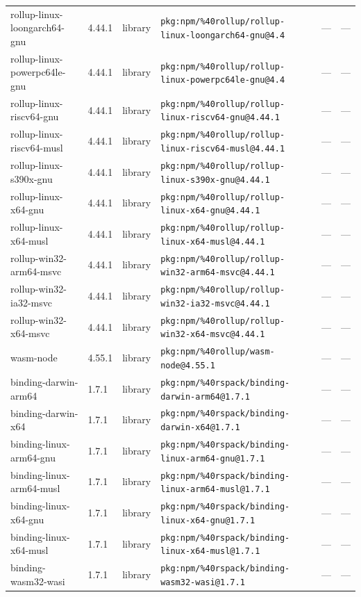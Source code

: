 \documentclass[11pt]{article}
\begin{document}
\begin{longtable}{|l|l|l|p{2.2cm}|l|p{4cm}|}
rollup-linux-loongarch64-gnu & 4.44.1 & library & \texttt{pkg:npm/\%40rollup/rollup-linux-loongarch64-gnu@4.4} & — & — \\
rollup-linux-powerpc64le-gnu & 4.44.1 & library & \texttt{pkg:npm/\%40rollup/rollup-linux-powerpc64le-gnu@4.4} & — & — \\
rollup-linux-riscv64-gnu & 4.44.1 & library & \texttt{pkg:npm/\%40rollup/rollup-linux-riscv64-gnu@4.44.1} & — & — \\
rollup-linux-riscv64-musl & 4.44.1 & library & \texttt{pkg:npm/\%40rollup/rollup-linux-riscv64-musl@4.44.1} & — & — \\
rollup-linux-s390x-gnu & 4.44.1 & library & \texttt{pkg:npm/\%40rollup/rollup-linux-s390x-gnu@4.44.1} & — & — \\
rollup-linux-x64-gnu & 4.44.1 & library & \texttt{pkg:npm/\%40rollup/rollup-linux-x64-gnu@4.44.1} & — & — \\
rollup-linux-x64-musl & 4.44.1 & library & \texttt{pkg:npm/\%40rollup/rollup-linux-x64-musl@4.44.1} & — & — \\
rollup-win32-arm64-msvc & 4.44.1 & library & \texttt{pkg:npm/\%40rollup/rollup-win32-arm64-msvc@4.44.1} & — & — \\
rollup-win32-ia32-msvc & 4.44.1 & library & \texttt{pkg:npm/\%40rollup/rollup-win32-ia32-msvc@4.44.1} & — & — \\
rollup-win32-x64-msvc & 4.44.1 & library & \texttt{pkg:npm/\%40rollup/rollup-win32-x64-msvc@4.44.1} & — & — \\
wasm-node & 4.55.1 & library & \texttt{pkg:npm/\%40rollup/wasm-node@4.55.1} & — & — \\
binding-darwin-arm64 & 1.7.1 & library & \texttt{pkg:npm/\%40rspack/binding-darwin-arm64@1.7.1} & — & — \\
binding-darwin-x64 & 1.7.1 & library & \texttt{pkg:npm/\%40rspack/binding-darwin-x64@1.7.1} & — & — \\
binding-linux-arm64-gnu & 1.7.1 & library & \texttt{pkg:npm/\%40rspack/binding-linux-arm64-gnu@1.7.1} & — & — \\
binding-linux-arm64-musl & 1.7.1 & library & \texttt{pkg:npm/\%40rspack/binding-linux-arm64-musl@1.7.1} & — & — \\
binding-linux-x64-gnu & 1.7.1 & library & \texttt{pkg:npm/\%40rspack/binding-linux-x64-gnu@1.7.1} & — & — \\
binding-linux-x64-musl & 1.7.1 & library & \texttt{pkg:npm/\%40rspack/binding-linux-x64-musl@1.7.1} & — & — \\
binding-wasm32-wasi & 1.7.1 & library & \texttt{pkg:npm/\%40rspack/binding-wasm32-wasi@1.7.1} & — & — \\

\end{longtable}
\end{document}
